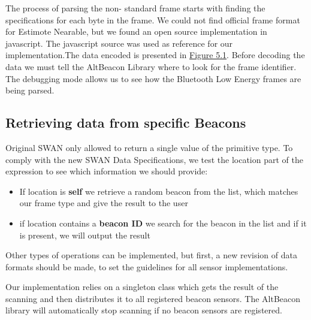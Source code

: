 The process of parsing the non- standard frame starts with finding the specifications for each byte in the frame. We could not find official frame format for Estimote Nearable, but we found an open source implementation in javascript.
The javascript source was used as reference for our implementation.The data encoded is presented in \hyperref[fig:estimote_format]{Figure 5.1}.
Before decoding the data we must tell the AltBeacon Library where to look for the frame identifier. The debugging mode allows us to see how the Bluetooth Low Energy frames are being parsed.

\subsection{Retrieving data from specific Beacons}
Original SWAN only allowed to return a single value of the primitive type. To comply with the new SWAN Data Specifications, we test the location part of the expression to see which information we should provide:

\begin{itemize}
 \item If location is \textbf{self} we retrieve a random beacon from the list, which matches our frame type and give the result to the user
 \item if location contains a \textbf{beacon ID} we search for the beacon in the list and if it is present, we will output the result
\end{itemize}

Other types of operations can be implemented, but first, a new revision of data formats should be made, to set the guidelines for all sensor implementations.

Our implementation relies on a singleton class which gets the result of the scanning and then distributes it to all registered beacon sensors. The AltBeacon library will automatically stop scanning
if no beacon sensors are registered.

